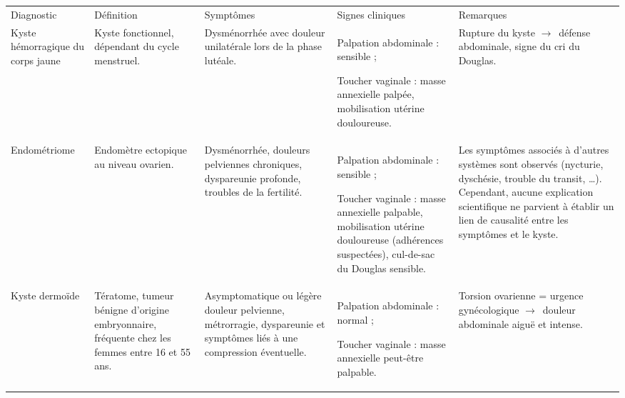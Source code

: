 \begin{landscape}
\begingroup
\small
\singlespacing
\setlength{\parindent}{0pt}
\setlength{\tabcolsep}{5pt}
\renewcommand{\arraystretch}{1.12}
\centering
{}
\label{tab:hypothesesDiagnostiques}
\noindent\begin{tabularx}{\linewidth}{|L{2.8cm}|L{4.5cm}|L{4.9cm}|L{6.4cm}|Y|}
  \hline
  Diagnostic & Définition & Symptômes & Signes cliniques & Remarques \\
  \hhline{|=====|}
  Kyste hémorragique du corps jaune &
  Kyste fonctionnel, dépendant du cycle menstruel. &
  Dysménorrhée avec douleur unilatérale lors de la phase lutéale. &
  \begin{tableitemize}
    \item Palpation abdominale : sensible ;
    \item Toucher vaginale : masse annexielle palpée, mobilisation utérine douloureuse.
  \end{tableitemize} &
  Rupture du kyste $\rightarrow$~défense abdominale, signe du cri du Douglas. \\
  \hline
  Endométriome &
  Endomètre ectopique au niveau ovarien. &
  Dysménorrhée, douleurs pelviennes chroniques, dyspareunie profonde, troubles de la fertilité. &
  \begin{tableitemize}
    \item Palpation abdominale : sensible ;
    \item Toucher vaginale : masse annexielle palpable, mobilisation utérine douloureuse (adhérences suspectées), cul-de-sac du Douglas sensible.
  \end{tableitemize} &
  Les symptômes associés à d’autres systèmes sont observés (nycturie, dyschésie, trouble du transit, \ldots). Cependant, aucune explication scientifique ne parvient à établir un lien de causalité entre les symptômes et le kyste. \\
  \hline
  Kyste dermoïde &
  Tératome, tumeur bénigne d'origine embryonnaire, fréquente chez les femmes entre 16 et 55 ans. &
  Asymptomatique ou légère douleur pelvienne, métrorragie, dyspareunie et symptômes liés à une compression éventuelle. &
  \begin{tableitemize}
    \item Palpation abdominale : normal ;
    \item Toucher vaginale : masse annexielle peut-être palpable.
  \end{tableitemize} &
  Torsion ovarienne = urgence gynécologique $\rightarrow$~douleur abdominale aiguë et intense. \\

\end{tabularx}
\end{landscape}
